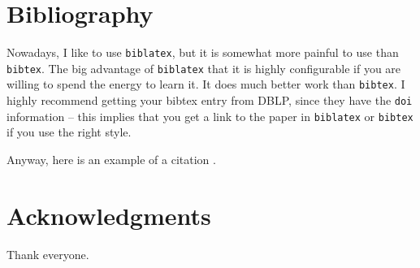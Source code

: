 \documentclass[12pt]{article}
\begin{document}

\section{Bibliography}

Nowadays, I like to use \texttt{biblatex}, but it is somewhat more
painful to use than \texttt{bibtex}. The big advantage of
\texttt{biblatex} that it is highly configurable if you are willing to
spend the energy to learn it. It does much better work than
\texttt{bibtex}. I highly recommend getting your bibtex entry from
DBLP, since they have the \texttt{doi} information -- this implies
that you get a link to the paper in \texttt{biblatex} or
\texttt{bibtex} if you use the right style.

Anyway, here is an example of a citation \cite{k-spda-10}.






\section*{Acknowledgments}

Thank everyone.


\BibTexMode{%
   
   
}%
\BibLatexMode{\printbibliography}
\end{document}
